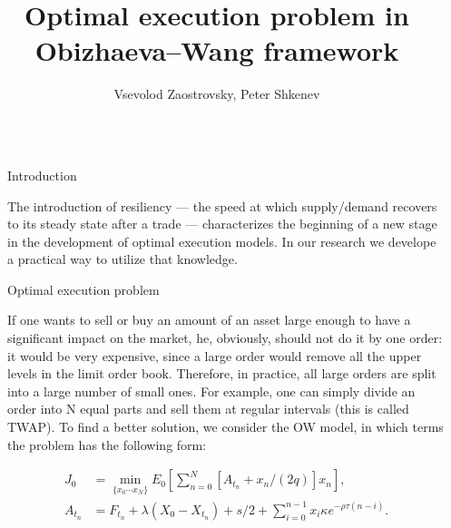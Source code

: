 \documentclass[]{beamer}
\title{Optimal execution problem in Obizhaeva--Wang framework}
\author{Vsevolod Zaostrovsky, Peter Shkenev}
\begin{document}
\nocite{*} %

\begin{frame}[t]
    \begin{columns}[t] %
     
    \begin{column}{\lrmargin}\end{column} %
    
    \begin{column}{\onecolwid} %
     
    
    \begin{block}{Introduction}
    
        The introduction of resiliency --- the speed at which supply/demand recovers to its steady state after 
        a trade --- characterizes the beginning of a new stage in the development of optimal execution models.
        In our research we develope a practical way to utilize that knowledge.
        
    
    \end{block}

    \begin{block}{Optimal execution problem}
    
        If one wants to sell or buy an amount of an asset large enough to have a significant 
        impact on the market, he, obviously, should not do it by one order: it would be very expensive, since a large order 
        would remove all the upper levels in the limit order book. Therefore, in practice, all large orders are split into a large number of small ones. 
        For example, one can simply divide an order into N equal parts and sell them at regular intervals (this is called TWAP). 
        To find a better solution, we consider the OW model, in which terms the problem has the following form: \par  


        
        \begin{align*}
           J_0 &= \min _{\{x_0 \cdots x_N \}} E_0 \left[ \sum _{n=0}^N [A_{t_n} + x_n /(2q)] x_n\right],  \\
           A_{t_n} &= F_{t_n} + \lambda (X_0 - X_{t_n}) + s/2 + \sum _{i=0}^{n-1} x_i \kappa e^{- \rho \tau (n - i)}.
        \end{align*}
        

\end{block}
\end{column}
\end{columns}
\end{frame}
\end{document}

